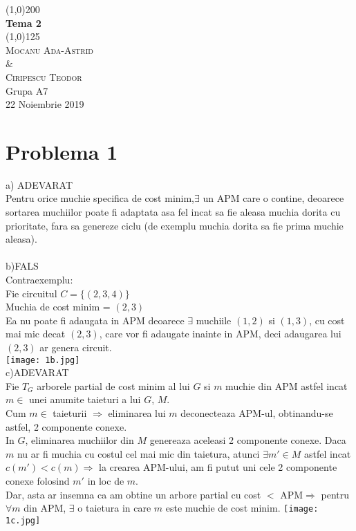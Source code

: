 \documentclass{article}
\begin{document}
\begin{titlepage}
	\begin{center}
	\line(1,0){200} \\
	[0.25 in]
	\huge{\bfseries Tema 2} \\
	[2mm]
	\line(1,0){125}\\
	[1.5cm]
	\textsc{\LARGE Mocanu Ada-Astrid\\ \& \\Ciripescu Teodor}\\
	[5mm]
	Grupa A7\\
	[10mm]
	\LARGE 22 Noiembrie 2019\\
	\end{center}
\end{titlepage}



\newpage
\section*{Problema 1}
\Large
a) ADEVARAT\\
Pentru orice muchie specifica de cost minim,$\exists$ un APM care o contine, deoarece sortarea muchiilor poate fi adaptata asa fel incat sa fie aleasa muchia dorita cu prioritate, fara sa genereze ciclu (de exemplu muchia dorita sa fie prima muchie aleasa).\\
 \bigskip\\
 b)FALS\\
 Contraexemplu:\\
 Fie circuitul $C=\{ (2,3,4)\} $\\
 Muchia de cost minim = $(2,3)$\\
 Ea nu poate fi adaugata in APM deoarece $\exists$ muchiile $(1,2)$ si $(1,3)$, cu cost mai mic decat $(2,3)$, care vor fi adaugate inainte in APM, deci adaugarea lui $(2,3)$ ar genera circuit.\\
 \texttt{[image: 1b.jpg]}
 \bigskip\\
c)ADEVARAT\\
Fie $T_{G}$ arborele partial de cost minim al lui $G$ si $m$ muchie din APM astfel incat $m \in$ unei anumite taieturi a lui $G$, $M$.\\
Cum $m\in$ taieturii $\Rightarrow$ eliminarea lui $m$ deconecteaza APM-ul, obtinandu-se astfel, 2 componente conexe.\\
In $G$, eliminarea muchiilor din $M$ genereaza aceleasi 2 componente conexe. Daca $m$ nu ar fi muchia cu costul cel mai mic din taietura, atunci $\exists m'\in M$ astfel incat $c(m')<c(m)\Rightarrow$ la crearea APM-ului, am fi putut uni cele 2 componente conexe folosind $m'$ in loc de $m$.\\
Dar, asta ar insemna ca am obtine un arbore partial cu cost $< $ APM$\Rightarrow $ pentru $ \forall m$ din APM, $\exists$ o taietura in care $m$ este muchie de cost minim.  
 \texttt{[image: 1c.jpg]}
\newpage
\end{document}

